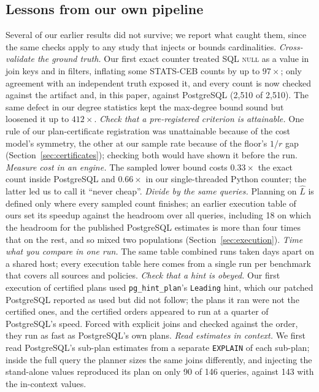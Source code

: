 \documentclass[sigconf, nonacm]{acmart}
\begin{document}
\subsection{Lessons from our own pipeline}
Several of our earlier results did not survive; we report what caught them,
since the same checks apply to any study that injects or bounds cardinalities.
\emph{Cross-validate the ground truth.} Our first exact counter treated SQL
\textsc{null} as a value in join keys and in filters, inflating some STATS-CEB
counts by up to $97\times$; only agreement with an independent
truth exposed it, and every count is now checked against the artifact and, in
this paper, against PostgreSQL (2{,}510 of 2{,}510). The same defect in our
degree statistics kept the max-degree bound sound but loosened it up to
$412\times$.
\emph{Check that a pre-registered criterion is attainable.} One rule of our
plan-certificate registration was unattainable because of the cost model's
symmetry, the other at our sample rate because of the floor's $1/r$ gap
(Section~\ref{sec:certificates}); checking both would have shown it before the run.
\emph{Measure cost in an engine.} The sampled lower bound costs $0.33\times$ the
exact count inside PostgreSQL and $0.66\times$ in our single-threaded Python
counter; the latter led us to call it ``never cheap''.
\emph{Divide by the same queries.} Planning on $\hat L$ is defined only where
every sampled count finishes; an earlier execution table of ours set its
speedup against the headroom over all queries, including 18 on which the
headroom for the published PostgreSQL estimates is more than four times that on
the rest, and so mixed two populations
(Section~\ref{sec:execution}).
\emph{Time what you compare in one run.} The same table combined runs taken
days apart on a shared host; every execution table here comes from a single
run per benchmark that covers all sources and policies.
\emph{Check that a hint is obeyed.} Our first execution of certified plans
used \texttt{pg\_hint\_plan}'s \texttt{Leading} hint, which our patched
PostgreSQL reported as used but did not follow; the plans it ran were not the
certified ones, and the certified orders appeared to run at a quarter of
PostgreSQL's speed. Forced with explicit joins and checked against the order,
they run as fast as PostgreSQL's own plans.
\emph{Read estimates in context.} We first read PostgreSQL's sub-plan estimates
from a separate \texttt{EXPLAIN} of each sub-plan; inside the full query the
planner sizes the same joins differently, and injecting the stand-alone values
reproduced its plan on only 90 of 146 queries, against 143 with the in-context
values.
\end{document}
